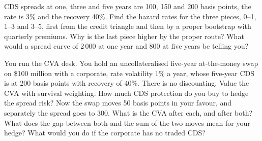 \begin{question}\label{iq:iv2:credit-and-xva:19}
CDS spreads at one, three and five years are 100, 150 and 200 basis points, the rate is 3\% and the recovery 40\%. Find the hazard rates for the three pieces, 0--1, 1--3 and 3--5, first from the credit triangle and then by a proper bootstrap with quarterly premiums. Why is the last piece higher by the proper route? What would a spread curve of 2\,000 at one year and 800 at five years be telling you?
\end{question}

\begin{question}\label{iq:iv2:credit-and-xva:20}
You run the CVA desk. You hold an uncollateralised five-year at-the-money swap on \$100 million with a corporate, rate volatility 1\% a year, whose five-year CDS is at 200 basis points with recovery of 40\%. There is no discounting. Value the CVA with survival weighting. How much CDS protection do you buy to hedge the spread risk? Now the swap moves 50 basis points in your favour, and separately the spread goes to 300. What is the CVA after each, and after both? What does the gap between both and the sum of the two moves mean for your hedge? What would you do if the corporate has no traded CDS?
\end{question}
